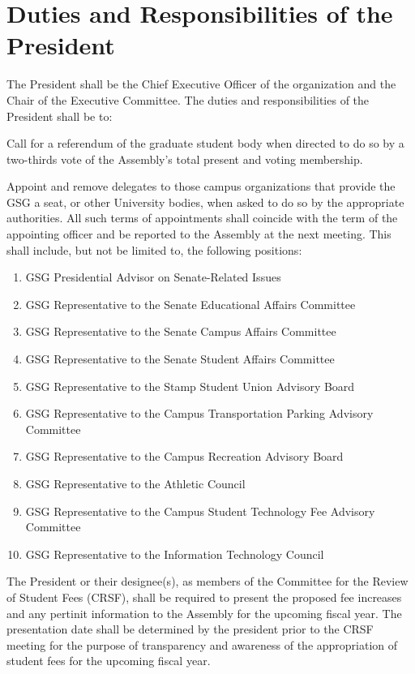 \section{Duties and Responsibilities of the President}
\begin{bylaws-number}
  \item The President shall be the Chief Executive Officer of the organization and the Chair of the Executive Committee. The duties and responsibilities of the President shall be to:
  \begin{bylaws-number}
    \item Call for a referendum of the graduate student body when directed to do so by a two-thirds vote of the Assembly’s total present and voting membership.
    \item Appoint and remove delegates to those campus organizations that provide the GSG a seat, or other University bodies, when asked to do so by the appropriate authorities. All such terms of appointments shall coincide with the term of the appointing officer and be reported to the Assembly at the next meeting. This shall include, but not be limited to, the following positions:
    \begin{enumerate}[i]
      \item GSG Presidential Advisor on Senate-Related Issues
      \item GSG Representative to the Senate Educational Affairs Committee
      \item GSG Representative to the Senate Campus Affairs Committee
      \item GSG Representative to the Senate Student Affairs Committee
      \item GSG Representative to the Stamp Student Union Advisory Board
      \item GSG Representative to the Campus Transportation Parking Advisory Committee
      \item GSG Representative to the Campus Recreation Advisory Board
      \item GSG Representative to the Athletic Council
      \item GSG Representative to the Campus Student Technology Fee Advisory Committee
      \item GSG Representative to the Information Technology Council
    \end{enumerate}
    \item The President or their designee(s), as members of the Committee for the Review of Student Fees (CRSF), shall be required to present the proposed fee increases and any pertinit information to the Assembly for the upcoming fiscal year. The presentation date shall be determined by the president prior to the CRSF meeting for the purpose of transparency and awareness of the appropriation of student fees for the upcoming fiscal year.

\end{bylaws-number}
\end{bylaws-number}
